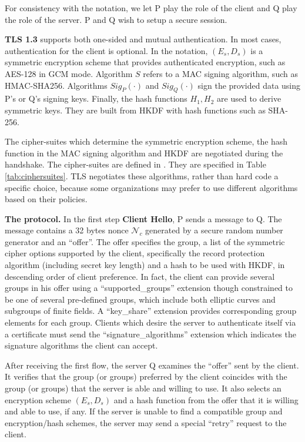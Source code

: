 For consistency with the notation, we let P play the role of the client and Q play the role of the server. P and Q wish to setup a secure session. 

\textbf{TLS 1.3} supports both one-sided and mutual authentication. In most cases, authentication for the client is optional. In the notation, $(E_s , D_s)$ is a symmetric encryption scheme that provides authenticated encryption, such as AES-128 in GCM mode.  Algorithm $S$ refers to a MAC signing algorithm, such as HMAC-SHA256. Algorithms $Sig_P(\cdot )$ and $Sig_Q(\cdot )$ sign the provided data using P's or Q's signing keys. Finally, the hash functions $H_1, H_2$ are used to derive symmetric keys. They are built from HKDF with hash functions such as SHA-256. 

The cipher-suites which determine the symmetric encryption scheme, the hash function in the MAC signing algorithm and HKDF are negotiated during the handshake. The cipher-suites are defined in \cite{rfc8446}. They are specified in Table \ref{tab:ciphersuites}. TLS negotiates these algorithms, rather than hard code a specific choice, because some organizations may prefer to use different algorithms based on their policies.


\textbf{The protocol.} In the first step \textbf{Client Hello}, P sends a message to Q. The message contains a 32 bytes nonce $\mathcal{N}_c$ generated by a secure random number generator and an ``offer''. The offer specifies the group, a list of the symmetric cipher options supported by the client, specifically the record protection algorithm (including secret key length) and a hash to be used with HKDF, in descending order of client preference. In fact, the client can provide several groups in his offer using a ``supported\_groups'' extension though constrained to be one of several pre-defined groups, which include both elliptic curves and subgroups of finite fields. A ``key\_share'' extension provides corresponding group elements for each group. Clients which desire the server to authenticate itself via a certificate must send the ``signature\_algorithms'' extension which indicates the signature algorithms the client can accept. 

After receiving the first flow, the server Q examines the ``offer'' sent by the client. It verifies that the group (or groups) preferred by the client coincides with the group (or groups) that the server is able and willing to use. It also selects an encryption scheme $(E_s , D_s)$ and a hash function
from the offer that it is willing and able to use, if any. If the server is unable to find a compatible group and encryption/hash schemes, the server may send a special ``retry'' request to the client.

